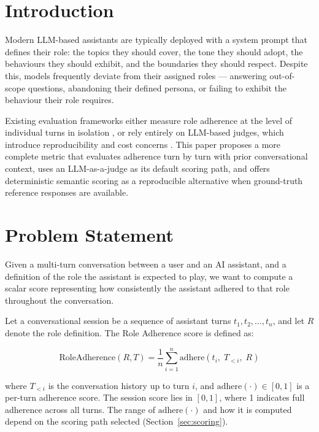 \documentclass[11pt,a4paper]{article}
\begin{document}
\section{Introduction}

Modern LLM-based assistants are typically deployed with a system prompt that
defines their role: the topics they should cover, the tone they should adopt,
the behaviours they should exhibit, and the boundaries they should respect.
Despite this, models frequently deviate from their assigned roles --- answering
out-of-scope questions, abandoning their defined persona, or failing to exhibit
the behaviour their role requires.

Existing evaluation frameworks either measure role adherence at the level of
individual turns in isolation \citep{zheng2023judging}, or rely entirely on
LLM-based judges, which introduce reproducibility and cost concerns
\citep{deriu2021survey}. This paper proposes a more complete metric that evaluates adherence
turn by turn with prior conversational context, uses an LLM-as-a-judge
as its default scoring path, and offers deterministic semantic scoring
as a reproducible alternative when ground-truth reference responses are available.

\section{Problem Statement}

Given a multi-turn conversation between a user and an AI assistant, and a
definition of the role the assistant is expected to play, we want to compute a
scalar score representing how consistently the assistant adhered to that role
throughout the conversation.

Let a conversational session be a sequence of assistant turns
$t_1, t_2, \ldots, t_n$, and let $R$ denote the role definition. The Role
Adherence score is defined as:

\begin{equation}
  \text{RoleAdherence}(R, T) = \frac{1}{n} \sum_{i=1}^{n}
  \text{adhere}(t_i,\; T_{<i},\; R)
  \label{eq:score}
\end{equation}

where $T_{<i}$ is the conversation history up to turn $i$, and
$\text{adhere}(\cdot) \in [0, 1]$ is a per-turn adherence score. The
session score lies in $[0, 1]$, where 1 indicates full adherence across
all turns. The range of $\text{adhere}(\cdot)$ and how it is computed
depend on the scoring path selected (Section~\ref{sec:scoring}).
\end{document}
